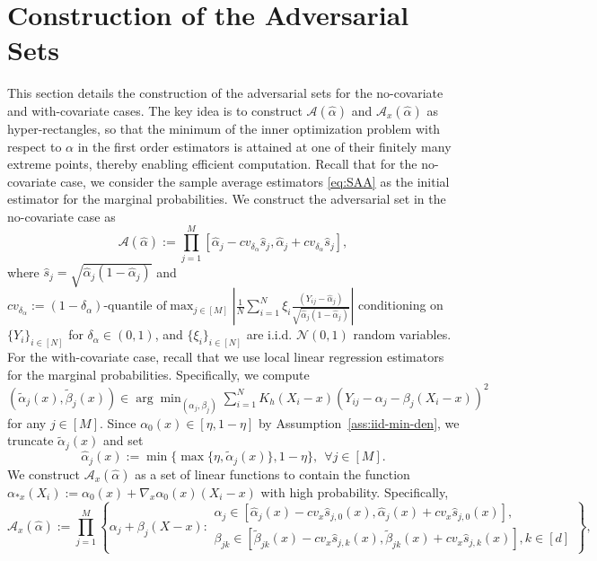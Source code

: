 \documentclass[11pt]{article}
\begin{document}
\section{Construction of the Adversarial Sets}\label{sec:marginals}
 This section details the construction of the adversarial sets for the no-covariate and with-covariate cases. The key idea is to construct $\mathcal{A}(\hat{\alpha})$ and $\mathcal{A}_x(\hat{\alpha})$ as hyper-rectangles, so that the minimum of the inner optimization problem with respect to $\alpha$ in the first order estimators is attained at one of their finitely many extreme points, thereby enabling efficient computation. Recall that for the no-covariate case, we consider the sample average estimators \eqref{eq:SAA} as the initial estimator for the marginal probabilities. We construct the adversarial set in the no-covariate case as
\begin{equation}\label{def:A:no-covariate}
\mathcal{A}(\hat\alpha) :=\prod_{j=1}^M [\hat\alpha_j - cv_{\delta_\alpha} \hat s_j, \hat\alpha_j + cv_{\delta_\alpha} \hat s_j],  
\end{equation}
where $\hat s_j= \sqrt{\hat\alpha_j(1-\hat\alpha_j)}$ and $cv_{\delta_\alpha} := (1-\delta_\alpha)\mbox{-quantile of} \max_{j\in[M]} \left| \frac{1}{N}\sum_{i=1}^N \xi_i \frac{(Y_{ij} - \hat \alpha_j)}{\sqrt{\hat\alpha_j(1-\hat\alpha_j)}}\right|$ conditioning on $\{Y_i\}_{i\in[N]}$ for $\delta_\alpha \in (0,1)$, and $\{\xi_i\}_{i\in[N]}$ are i.i.d. $\mathcal{N}(0,1)$ random variables. For the with-covariate case, recall that we use local linear regression estimators for the marginal probabilities. Specifically, we compute $(\tilde{\alpha}_{j}(x), \tilde\beta_j(x)) \in \arg\min_{(\alpha_j,\beta_j)}\sum_{i=1}^N K_h(X_i-x)(Y_{ij} - \alpha_j - \beta_j(X_i-x) )^2$ for any $j\in[M]$. Since $\alpha_0(x)\in[\eta,1-\eta]$ by Assumption~\ref{ass:iid-min-den}, we truncate $\tilde{\alpha}_{j}(x)$ and set
\begin{equation}\label{eq:truncate-local-linear}
\hat{\alpha}_j(x):=\min\{\max\{\eta,  \tilde{\alpha}_j(x)\} , 1-\eta\},\ \ \forall j\in[M].
\end{equation}
We construct $\mathcal{A}_x(\hat\alpha)$ as a set of linear functions to contain the function $\alpha_{*x}(X_i):=\alpha_0(x)+\nabla_x \alpha_0(x)(X_i-x)$ with high probability. Specifically,
$$\mathcal{A}_x(\hat\alpha) :=\prod_{j=1}^M \left\{ \!\alpha_j+\beta_j(X-x) :\!\!\! \begin{array}{l}\alpha_j \in [\hat \alpha_j(x) - cv_x \hat s_{j,0}(x), \hat\alpha_j(x) + cv_x \hat s_{j,0}(x)],  \\ 
\beta_{jk} \in [\tilde \beta_{jk}(x) - cv_x \hat s_{j,k}(x), \tilde \beta_{jk}(x) + cv_x \hat s_{j,k}(x)], k \in [d] 
\end{array}\!\!\right\},$$
\end{document}
